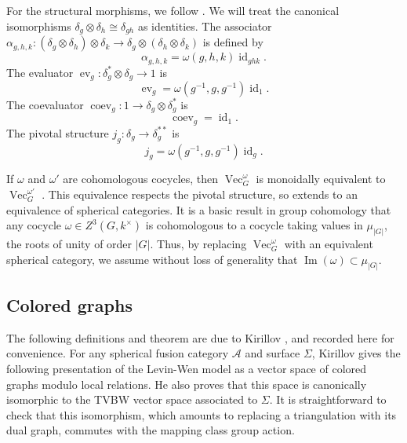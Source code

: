 \documentclass{ws-jktr}
\DeclareMathOperator{\id}{id}
\DeclareMathOperator{\Vect}{Vec}
\DeclareMathOperator{\Img}{Im}
\DeclareMathOperator{\coev}{coev}
\DeclareMathOperator{\ev}{ev}
\newcommand{\Si}{\Sigma}
\begin{document}
For the structural morphisms,  we follow \cite{math/0601012}.  We will treat the canonical isomorphisms $\delta_g \otimes \delta_h \cong \delta_{gh}$ as identities.    The associator $\alpha_{g,h,k}:(\delta_g \otimes \delta_h) \otimes \delta_k \to \delta_g \otimes (\delta_h \otimes \delta_k)$ is defined by
$$\alpha_{g,h,k} = \omega(g,h,k) \id_{ghk}.$$ 
The evaluator $\ev_g:\delta_g^* \otimes \delta_g \to 1$ is 
$$\ev_{g} = \omega(g^{-1},g,g^{-1}) \id_1.$$  
The coevaluator $\coev_g:1 \to \delta_g \otimes \delta_g^*$ is 
$$\coev_{g} = \id_1.$$ 
The pivotal structure $j_g:\delta_g \to \delta_g^{**}$ is 
$$j_{g} = \omega(g^{-1},g,g^{-1}) \id_{g}.$$

If $\omega$ and $\omega'$ are cohomologous cocycles, then $\Vect_G^\omega$ is monoidally equivalent to $\Vect_G^{\omega'}$ \cite{etingofTensor}.  This equivalence respects the pivotal structure, so extends to an equivalence of spherical categories.  It is a basic result in group cohomology that any cocycle $\omega \in Z^3(G, k^\times)$ is cohomologous to a cocycle taking values in $\mu_{|G|}$, the roots of unity of order $|G|$.  Thus, by replacing $\Vect^\omega_G$ with an equivalent spherical category, we assume  without loss of generality that $\Img(\omega) \subset \mu_{|G|}$.  

\newcommand{\ee}{\mathbf{e}}       %
\newcommand{\A}{\mathcal{A}}      %
\newcommand{\st}{\; | \;}                               %
\newcommand{\ttt}{\otimes}                              %
\newcommand{\cc}[1]{\underset{\scriptstyle #1}{\circ}}
\newcommand{\ccc}[1]{\underset{\scriptstyle #1}{\bullet}}
\newcommand{\ti}{\tilde}
\newcommand{\ov}{\overline}
\newcommand{\del}{\partial}
\newcommand{\<}{\langle}
\renewcommand{\>}{\rangle}
\newcommand{\surjto}{\twoheadrightarrow}      %
\newcommand{\injto}{\hookrightarrow}          %
\newcommand{\isoto}{\xrightarrow{\sim}}       %
\newcommand{\xxto}{\xrightarrow}              %
\newcommand{\firef}[1]{Figure~{\rm\ref{#1}}}
\newcommand{\R}{\mathbb{R}}       %


\subsection{Colored graphs}\label{s:colored}

The following definitions and theorem are due to Kirillov
\cite{kirillovStringNets}, and recorded here for convenience.  For any
spherical fusion category $\mathcal A$ and surface $\Si$, Kirillov gives the
following presentation of the Levin-Wen model as a vector space of
colored graphs modulo local relations.  He also proves that this space
is canonically isomorphic to the TVBW vector space associated to
$\Si$.  It is straightforward to check that this isomorphism, which
amounts to replacing a triangulation with its dual graph, commutes
with the mapping class group action.
\end{document}
